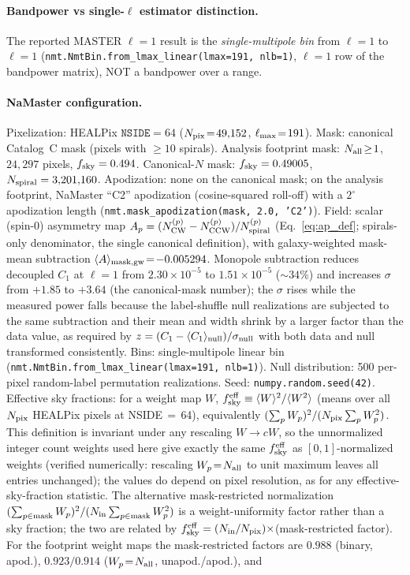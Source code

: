 \documentclass[aps,prd,twocolumn,superscriptaddress,preprintnumbers,nofootinbib,longbibliography,floatfix]{revtex4-2}
\newcommand{\nside}{\texttt{NSIDE}}
\begin{document}
\paragraph{Bandpower vs single-$\ell$ estimator distinction.}
The reported MASTER $\ell\!=\!1$ result is the \emph{single-multipole bin} from $\ell\!=\!1$ to $\ell\!=\!1$ (\texttt{nmt.NmtBin.from\_lmax\_linear(lmax=191, nlb=1)}, $\ell\!=\!1$ row of the bandpower matrix), NOT a bandpower over a range.

\paragraph{NaMaster configuration.}
Pixelization: HEALPix $\nside\!=\!64$ ($N_{\rm pix}\!=\!49{,}152$, $\ell_{\rm max}\!=\!191$). Mask: canonical Catalog~C mask (pixels with $\geq\!10$ spirals). Analysis footprint mask: $N_{\rm all}\!\geq\!1$, $24{,}297$ pixels, $f_{\rm sky}=0.494$. Canonical-$N$ mask: $f_{\rm sky}=0.49005$, $N_{\rm spiral}=3{,}201{,}160$. Apodization: none on the canonical mask; on the analysis footprint, NaMaster ``C2'' apodization (cosine-squared roll-off) with a $2^\circ$ apodization length (\texttt{nmt.mask\_apodization(mask, 2.0, 'C2')}). Field: scalar (spin-0) asymmetry map $A_p = (N_{\rm CW}^{(p)} - N_{\rm CCW}^{(p)}) / N_{\rm spiral}^{(p)}$ (Eq.~\ref{eq:ap_def}; spirals-only denominator, the single canonical definition), with galaxy-weighted mask-mean subtraction $\langle A\rangle_{\rm mask,gw}\!=\!-0.005294$. Monopole subtraction reduces decoupled $C_1$ at $\ell\!=\!1$ from $2.30\!\times\!10^{-5}$ to $1.51\!\times\!10^{-5}$ ($\sim\!34\%$) and increases $\sigma$ from $+1.85$ to $+3.64$ (the canonical-mask number); the $\sigma$ rises while the measured power falls because the label-shuffle null realizations are subjected to the same subtraction and their mean and width shrink by a larger factor than the data value, as required by $z=(C_1-\langle C_1\rangle_{\rm null})/\sigma_{\rm null}$ with both data and null transformed consistently. Bins: single-multipole linear bin (\texttt{nmt.NmtBin.from\_lmax\_linear(lmax=191, nlb=1)}). Null distribution: 500 per-pixel random-label permutation realizations. Seed: \texttt{numpy.random.seed(42)}. Effective sky fractions: for a weight map $W$, $f_{\rm sky}^{\rm eff} \equiv \langle W\rangle^{2}/\langle W^{2}\rangle$ (means over all $N_{\rm pix}$ HEALPix pixels at NSIDE$\,=\,$64), equivalently $(\sum_p W_p)^2/(N_{\rm pix}\sum_p W_p^2)$. This definition is invariant under any rescaling $W\!\to\!cW$, so the unnormalized integer count weights used here give exactly the same $f_{\rm sky}^{\rm eff}$ as $[0,1]$-normalized weights (verified numerically: rescaling $W_p\!=\!N_{\rm all}$ to unit maximum leaves all entries unchanged); the values do depend on pixel resolution, as for any effective-sky-fraction statistic. The alternative mask-restricted normalization $(\sum_{p\in\rm mask} W_p)^2/(N_{\rm in}\sum_{p\in\rm mask} W_p^2)$ is a weight-uniformity factor rather than a sky fraction; the two are related by $f_{\rm sky}^{\rm eff} = (N_{\rm in}/N_{\rm pix})\times$(mask-restricted factor). For the footprint weight maps the mask-restricted factors are $0.988$ (binary, apod.), $0.923/0.914$ ($W_p\!=\!N_{\rm all}$, unapod./apod.), and 
\end{document}
